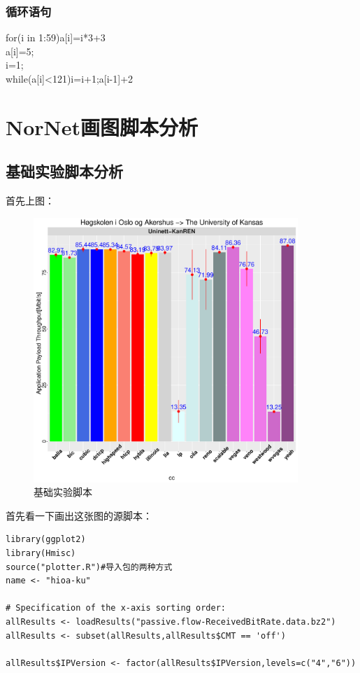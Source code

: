 \documentclass[a4paper,12pt]{ctexbook}
\begin{document}
\begin{flushleft}
\subsection{循环语句}
for(i in 1:59){a[i]=i*3+3}\\

a[i]=5;\\
i=1;\\
while(a[i]<121){i=i+1;a[i-1]+2}


\chapter{NorNet画图脚本分析}
\section{基础实验脚本分析}
首先上图：
\begin{figure}[H]
	\begin{center}
	\includegraphics[width=10cm]{NorNet示例/demo-hioa-ku/hioa-ku-IPv6.pdf}
	\caption{基础实验脚本}
	\end{center}
\end{figure}
首先看一下画出这张图的源脚本：
\begin{verbatim}
library(ggplot2)
library(Hmisc)
source("plotter.R")#导入包的两种方式
name <- "hioa-ku"

# Specification of the x-axis sorting order:
allResults <- loadResults("passive.flow-ReceivedBitRate.data.bz2")
allResults <- subset(allResults,allResults$CMT == 'off')

allResults$IPVersion <- factor(allResults$IPVersion,levels=c("4","6"))


\end{verbatim}
\end{flushleft}
\end{document}
